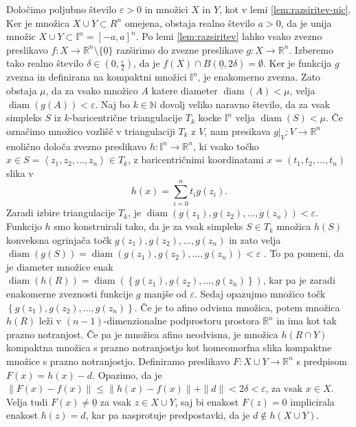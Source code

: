 \documentclass[mat1]{fmfdelo}
\newcommand{\R}{\mathbb R}
\newcommand{\N}{\mathbb N}
\DeclareMathOperator{\diam}{diam}
\newcommand{\I}{\mathbb I}
\newcommand{\0}{\underline{0}}
\begin{document}
\begin{dokaz}
Določimo poljubno število $\varepsilon > 0$ in množici $X$ in $Y$, kot v lemi \ref{lem:razsiritev-nic}. Ker je množica $X \cup Y \subset R^n$ omejena, obstaja realno število $a > 0$, da je unija množic $X \cup Y \subset \I^n = \left [ -a, a \right ]^n$. Po lemi \ref{lem:razsiritev} lahko vsako zvezno preslikavo $f : X \to \R^n \setminus \{ \0 \}$ razširimo do zvezne preslikave $g : X \to \R^n$. Izberemo tako realno število $\delta \in (0, \frac{\varepsilon}{2})$, da je $f(X) \cap B( \0, 2\delta) = \emptyset$. Ker je funkcija $g$ zvezna in definirana na kompaktni množici $\I^n$, je enakomerno zvezna. Zato obstaja $\mu$, da za vsako množico $A$ katere diameter $\diam(A) < \mu$, velja $\diam(g(A)) < \varepsilon$. Naj bo $k \in \N$ dovolj veliko naravno število, da za vsak simpleks $S$ iz $k$-baricentrične triangulacije $T_k$ kocke $\I^n$ velja $\diam(S) < \mu$. Če označimo množico vozlišč v triangulaciji $T_k$ z $V$, nam presikava $g|_V : V \to \R^n$ enolično določa zvezno preslikavo $h : \I^n \to \R^n$, ki vsako točko $x \in S = \left < z_1, z_2, \dots, z_n \right > \in T_k$, z baricentričnimi koordinatami $x = (t_1, t_2, \dots, t_n)$ slika v 
$$h(x) = \sum_{i=0}^n t_i g(z_i).$$
Zaradi izbire triangulacije $T_k$, je $\diam(g(z_1), g(z_2), \dots, g(z_n)) < \varepsilon$. Funkcijo $h$ smo konstruirali tako, da je za vsak simpleks $S \in T_k$ množica $h(S)$ konveksna ogrinjača točk $g(z_1), g(z_2), \dots, g(z_n)$ in zato velja $\diam(g(S)) = \diam(g(z_1), g(z_2), \dots, g(z_n)) < \varepsilon$ . To pa pomeni, da je diameter množice enak $\diam(h(R)) = \diam(\left \{ g(z_1), g(z_2), \dots, g(z_n) \right \})$, kar pa je zaradi enakomerne zveznosti funkcije $g$ manjše od $\varepsilon$.
Sedaj opazujmo množico točk $\left \{ g(z_1), g(z_2), \dots, g(z_n) \right \}$. Če je to afino odvisna množica, potem množica $h(R)$ leži v $(n-1)$-dimenzionalne podprostoru prostora $\R^n$ in ima kot tak prazno notranjost. Če pa je množica afino neodvisna, je množica $h(R \cap Y)$ kompaktna množica s prazno notranjostjo kot homeomorfna slika kompaktne množice s prazno notranjostjo.
Definiramo preslikavo $F : X \cup Y \to \R^n$ s predpisom $F(x)  = h(x) - d$. Opazimo, da je $\| F(x) - f(x) \| \leq \| h(x) - f(x) \| + \| d \| < 2\delta < \varepsilon$, za vsak $x \in X$. Velja tudi $F(x) \neq \0$ za vsak $z \in X \cup Y$, saj bi enakost $F(z) = 0$ implicirala enakost $h(z) = d$, kar pa nasprotuje predpostavki, da je $d \notin h(X \cup Y)$.
\end{dokaz}
\end{document}
